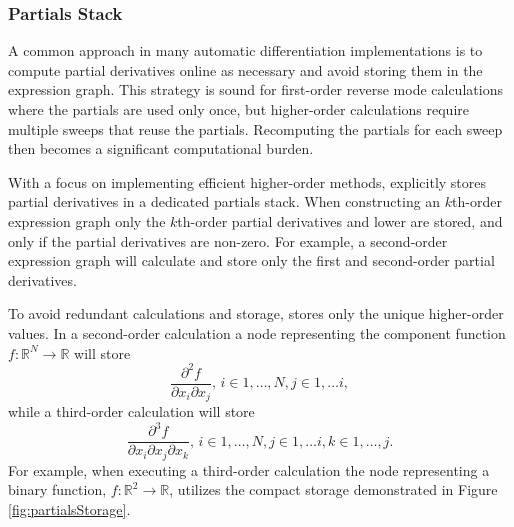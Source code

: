 \subsubsection{Partials Stack}

A common approach in many automatic differentiation implementations
is to compute partial derivatives online as necessary and avoid storing them
in the expression graph.  This strategy is sound for first-order reverse
mode calculations where the partials are used only once, but higher-order
calculations require multiple sweeps that reuse the partials.  Recomputing
the partials for each sweep then becomes a significant computational burden.

With a focus on implementing efficient higher-order methods, \nomad 
explicitly stores partial derivatives in a dedicated partials stack.  When 
constructing an $k$th-order expression graph only the $k$th-order partial 
derivatives and lower are stored, and only if the partial derivatives are 
non-zero.  For example, a second-order expression graph will calculate 
and store only the first and second-order partial derivatives.

To avoid redundant calculations and storage, \nomad stores only the 
unique higher-order values.  In a second-order calculation a node 
representing the component function 
$f: \mathbb{R}^{N} \rightarrow \mathbb{R}$ will store
%
\begin{equation*}
\frac{ \partial^{2} f }{ \partial x_{i} \partial x_{j} }, \, i \in 1, \ldots, N, j \in 1, \ldots i,
\end{equation*}
%
while a third-order calculation will store
%
\begin{equation*}
\frac{ \partial^{3} f }{ \partial x_{i} \partial x_{j} \partial x_{k} }, \, 
i \in 1, \ldots, N, j \in 1, \ldots i, k \in 1, \ldots, j.
\end{equation*}
%
For example, when executing a third-order calculation the node representing
a binary function, $f : \mathbb{R}^{2} \rightarrow \mathbb{R}$, utilizes the
compact storage demonstrated in Figure \ref{fig:partialsStorage}.

